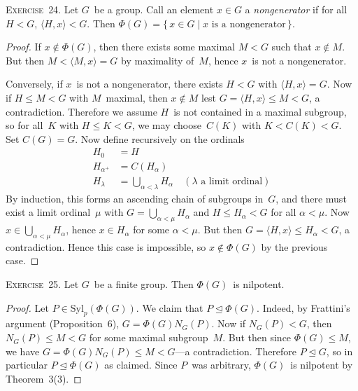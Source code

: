 \documentclass[letterpaper]{article}
\newcommand{\exercise}[1]{\goodbreak\noindent\textsc{Exercise~{#1}.}}
\newcommand{\bigunion}{\bigcup}
\newcommand{\subgroup}{\le}
\newcommand{\normal}{\trianglelefteq}
\newcommand{\syl}{\mathrm{Syl}}
\newcommand{\gen}[1]{\langle{#1}\rangle}
\begin{document}
\exercise{24} Let $G$~be a group. Call an element $x\in G$ a \emph{nongenerator} if for all $H<G$, $\gen{H,x}<G$. Then $\Phi(G)=\{\,x\in G\mid x\text{ is a nongenerator}\,\}$.
\begin{proof}
If $x\not\in\Phi(G)$, then there exists some maximal $M<G$ such that $x\not\in M$. But then $M<\gen{M,x}=G$ by maximality of~$M$, hence $x$~is not a nongenerator.

Conversely, if $x$~is not a nongenerator, there exists $H<G$ with $\gen{H,x}=G$. Now if $H\subgroup M<G$ with $M$~maximal, then $x\not\in M$ lest $G=\gen{H,x}\subgroup M<G$, a contradiction. Therefore we assume $H$~is not contained in a maximal subgroup, so for all~$K$ with $H\subgroup K<G$, we may choose~$C(K)$ with $K<C(K)<G$. Set $C(G)=G$. Now define recursively on the ordinals
\begin{align*}
H_0&=H\\
H_{\alpha^+}&=C(H_{\alpha})\\
H_{\lambda}&=\bigunion_{\alpha<\lambda}H_{\alpha}\quad(\lambda\text{ a limit ordinal})
\end{align*}
By induction, this forms an ascending chain of subgroups in~$G$, and there must exist a limit ordinal~$\mu$ with $G=\bigunion_{\alpha<\mu}H_{\alpha}$ and $H\subgroup H_{\alpha}<G$ for all $\alpha<\mu$. Now $x\in\bigunion_{\alpha<\mu}H_{\alpha}$, hence $x\in H_{\alpha}$ for some $\alpha<\mu$. But then $G=\gen{H,x}\subgroup H_{\alpha}<G$, a contradiction. Hence this case is impossible, so $x\not\in\Phi(G)$ by the previous case.
\end{proof}

\exercise{25}
Let $G$~be a finite group. Then $\Phi(G)$~is nilpotent.
\begin{proof}
Let $P\in\syl_p(\Phi(G))$. We claim that $P\normal\Phi(G)$. Indeed, by Frattini's argument (Proposition~6), $G=\Phi(G)N_G(P)$. Now if $N_G(P)<G$, then $N_G(P)\subgroup M<G$ for some maximal subgroup~$M$. But then since $\Phi(G)\subgroup M$, we have $G=\Phi(G)N_G(P)\subgroup M<G$---a contradiction. Therefore $P\normal G$, so in particular $P\normal\Phi(G)$ as claimed. Since $P$~was arbitrary, $\Phi(G)$~is nilpotent by Theorem~3(3).
\end{proof}
\end{document}
